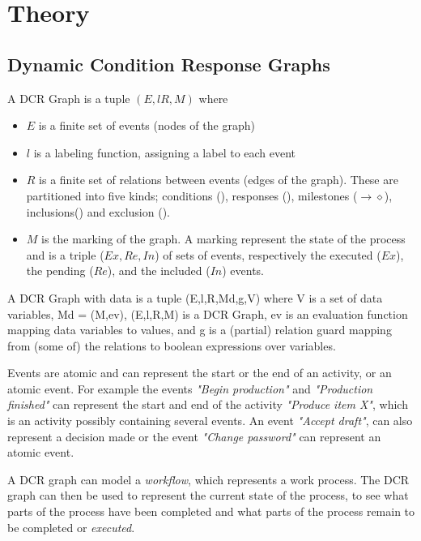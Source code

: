 \chapter{Theory}\label{chap:theory}
	\section{Dynamic Condition Response Graphs}
	
	\begin{definition}
		A DCR Graph is a tuple $(E, l R, M)$ where
		\begin{itemize}
			\item $E$ is a finite set of events (nodes of the graph)
			\item $l$ is a labeling function, assigning a label to each event
			\item $R$ is a finite set of relations between events (edges of the graph). These are partitioned into five kinds; conditions (\condition), responses (\response), milestones ($\rightarrow\!\!\!\diamond$), inclusions(\inclusion) and exclusion (\exclusion).
			\item $M$ is the marking of the graph. A marking represent the state of the process and is a triple ($Ex,Re,In$) of sets of events, respectively the executed ($Ex$), the pending ($Re$), and the included ($In$) events.
		\end{itemize}
		A DCR Graph with data is a tuple (E,l,R,Md,g,V) where V is a set of data variables, Md = (M,ev), (E,l,R,M) is a DCR Graph, ev is an evaluation function mapping data variables to values, and g is a (partial) relation guard mapping from (some of) the relations to boolean expressions over variables. 
	\end{definition}
	Events are atomic and can represent the start or the end of an activity, or an atomic event. 
	For example the events \textit{"Begin production"} and \textit{"Production finished"} can represent the start and end of the activity \textit{"Produce item X"}, which is an activity possibly containing several events. An event \textit{"Accept draft"}, can also represent a decision made or the event \textit{"Change password"} can represent an atomic event.
	
	A DCR graph can model a \textit{workflow}, which represents a work process. The DCR graph can then be used to represent the current state of the process, to see what parts of the process have been completed and what parts of the process remain to be completed or \textit{executed}. 
	
